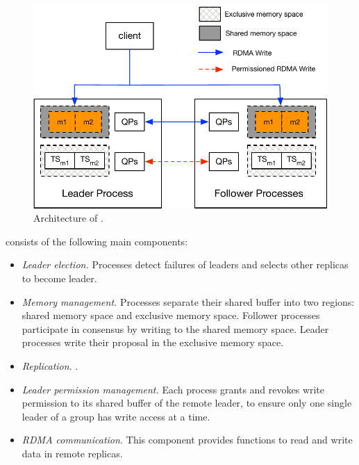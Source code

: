 \begin{figure}[ht!]
  \centering
  \includegraphics[width=1\linewidth]{figures/architecture}
  \caption{Architecture of \libname.}
  \label{fig:arch}
\end{figure}


\libname consists of the following main components:
\begin{itemize}
  \item \emph{Leader election.} Processes detect failures of leaders and
  selects other replicas to become leader.
  \item \emph{Memory management.} Processes separate their shared buffer into two
  regions: shared memory space and exclusive memory space. Follower processes
  participate in consensus by writing to the shared memory space. Leader
  processes write their proposal in the exclusive memory space.
  \item \emph{Replication.} .
  \item \emph{Leader permission management.} Each process grants and revokes
  write permission to its shared buffer of the remote leader, to ensure only one
  single leader of a group has write access at a time.
  \item \emph{RDMA communication.} This component provides functions to read and
  write data in remote replicas.
\end{itemize}

